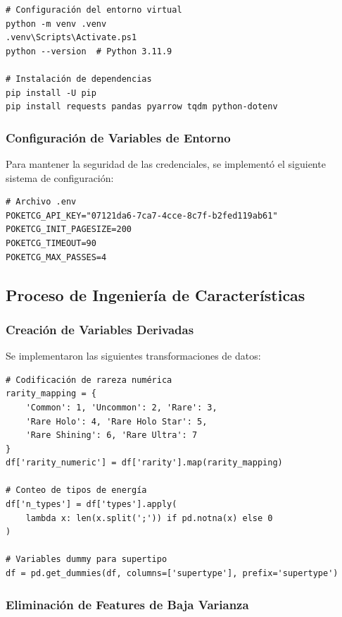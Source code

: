 \documentclass[12pt,letterpaper]{article}
\begin{document}
\begin{verbatim}
# Configuración del entorno virtual
python -m venv .venv
.venv\Scripts\Activate.ps1
python --version  # Python 3.11.9

# Instalación de dependencias
pip install -U pip
pip install requests pandas pyarrow tqdm python-dotenv
\end{verbatim}

\subsubsection{Configuración de Variables de Entorno}

Para mantener la seguridad de las credenciales, se implementó el siguiente sistema de configuración:

\begin{verbatim}
# Archivo .env
POKETCG_API_KEY="07121da6-7ca7-4cce-8c7f-b2fed119ab61"
POKETCG_INIT_PAGESIZE=200
POKETCG_TIMEOUT=90
POKETCG_MAX_PASSES=4
\end{verbatim}

\subsection{Proceso de Ingeniería de Características}

\subsubsection{Creación de Variables Derivadas}

Se implementaron las siguientes transformaciones de datos:

\begin{verbatim}
# Codificación de rareza numérica
rarity_mapping = {
    'Common': 1, 'Uncommon': 2, 'Rare': 3,
    'Rare Holo': 4, 'Rare Holo Star': 5,
    'Rare Shining': 6, 'Rare Ultra': 7
}
df['rarity_numeric'] = df['rarity'].map(rarity_mapping)

# Conteo de tipos de energía
df['n_types'] = df['types'].apply(
    lambda x: len(x.split(';')) if pd.notna(x) else 0
)

# Variables dummy para supertipo
df = pd.get_dummies(df, columns=['supertype'], prefix='supertype')
\end{verbatim}

\subsubsection{Eliminación de Features de Baja Varianza}
\end{document}
